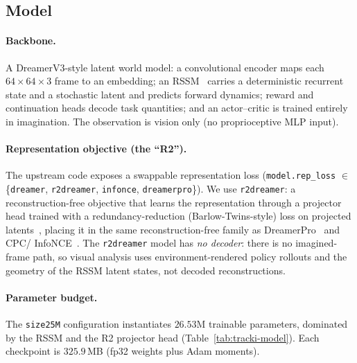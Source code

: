 \documentclass[11pt,a4paper]{article}
\begin{document}
\subsection{Model}
\label{sec:tracki-model}

\paragraph{Backbone.} A DreamerV3-style latent world model: a convolutional
encoder maps each $64{\times}64{\times}3$ frame to an embedding; an
RSSM~\cite{planet} carries a deterministic recurrent state and a stochastic
latent and predicts forward dynamics; reward and continuation heads decode task
quantities; and an actor--critic is trained entirely in imagination. The
observation is vision only (no proprioceptive MLP input).

\paragraph{Representation objective (the ``R2'').} The upstream code exposes a
swappable representation loss (\texttt{model.rep\_loss} $\in$ \{\texttt{dreamer},
\texttt{r2dreamer}, \texttt{infonce}, \texttt{dreamerpro}\}). We use
\texttt{r2dreamer}: a reconstruction-free objective that learns the
representation through a projector head trained with a redundancy-reduction
(Barlow-Twins-style) loss on projected latents~\cite{barlow}, placing it in the
same reconstruction-free family as DreamerPro~\cite{dreamerpro} and CPC/
InfoNCE~\cite{cpc}. The \texttt{r2dreamer} model has \emph{no decoder}: there is
no imagined-frame path, so visual analysis uses environment-rendered policy
rollouts and the geometry of the RSSM latent states, not decoded
reconstructions.

\paragraph{Parameter budget.} The \texttt{size25M} configuration instantiates
$26.53$M trainable parameters, dominated by the RSSM and the R2 projector head
(Table~\ref{tab:tracki-model}). Each checkpoint is $325.9$\,MB (fp32 weights
plus Adam moments).
\end{document}
